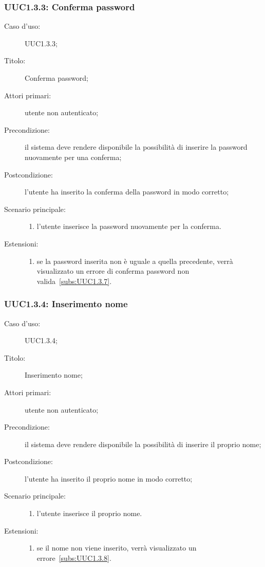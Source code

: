 \documentclass[../../../analisi-dei-requisiti.tex]{subfiles}
\begin{document}
\subsubsection{UUC1.3.3: Conferma password}%
\label{subs:UUC1.3.3}
\begin{description}
  \item[Caso d'uso:] UUC1.3.3;
  \item[Titolo:] Conferma password;
  \item[Attori primari:] utente non autenticato;
  \item[Precondizione:] il sistema deve rendere disponibile la possibilità di inserire la password nuovamente per una conferma;
  \item[Postcondizione:] l'utente ha inserito la conferma della password in modo corretto;
  \item[Scenario principale:]
        \begin{enumerate}
          \item l'utente inserisce la password nuovamente per la conferma.
        \end{enumerate}
  \item[Estensioni:]
        \begin{enumerate}
          \item se la password inserita non è uguale a quella precedente, verrà visualizzato un errore di conferma password non valida~\ref{subs:UUC1.3.7}.
        \end{enumerate}
\end{description}



\subsubsection{UUC1.3.4: Inserimento nome}%
\label{subs:UUC1.3.4}
\begin{description}
  \item[Caso d'uso:] UUC1.3.4;
  \item[Titolo:] Inserimento nome;
  \item[Attori primari:] utente non autenticato;
  \item[Precondizione:] il sistema deve rendere disponibile la possibilità di inserire il proprio nome;
  \item[Postcondizione:] l'utente ha inserito il proprio nome in modo corretto;
  \item[Scenario principale:]
        \begin{enumerate}
          \item l'utente inserisce il proprio nome.
        \end{enumerate}
  \item[Estensioni:]
        \begin{enumerate}
          \item se il nome non viene inserito, verrà visualizzato un errore~\ref{subs:UUC1.3.8}.
        \end{enumerate}
\end{description}
\end{document}
